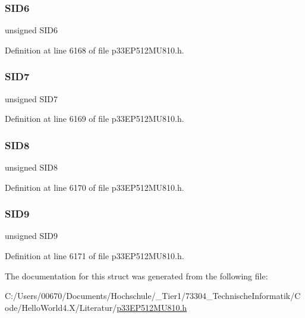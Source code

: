 \subsubsection{\texorpdfstring{S\+I\+D6}{SID6}}
{\footnotesize\ttfamily unsigned S\+I\+D6}



Definition at line 6168 of file p33\+E\+P512\+M\+U810.\+h.

\mbox{\label{structtag_c2_r_x_f0_s_i_d_b_i_t_s_a34097fb76decd431701fa2d86a22328e}} 
\subsubsection{\texorpdfstring{S\+I\+D7}{SID7}}
{\footnotesize\ttfamily unsigned S\+I\+D7}



Definition at line 6169 of file p33\+E\+P512\+M\+U810.\+h.

\mbox{\label{structtag_c2_r_x_f0_s_i_d_b_i_t_s_afe74894633244fdb0b0c01b4e8c522e7}} 
\subsubsection{\texorpdfstring{S\+I\+D8}{SID8}}
{\footnotesize\ttfamily unsigned S\+I\+D8}



Definition at line 6170 of file p33\+E\+P512\+M\+U810.\+h.

\mbox{\label{structtag_c2_r_x_f0_s_i_d_b_i_t_s_a33587704948067005c2a6a3ccc503c99}} 
\subsubsection{\texorpdfstring{S\+I\+D9}{SID9}}
{\footnotesize\ttfamily unsigned S\+I\+D9}



Definition at line 6171 of file p33\+E\+P512\+M\+U810.\+h.



The documentation for this struct was generated from the following file\+:\begin{DoxyCompactItemize}
\item 
C\+:/\+Users/00670/\+Documents/\+Hochschule/\+\_\+\+Tier1/73304\+\_\+\+Technische\+Informatik/\+Code/\+Hello\+World4.\+X/\+Literatur/\hyperlink{p33_e_p512_m_u810_8h}{p33\+E\+P512\+M\+U810.\+h}\end{DoxyCompactItemize}
